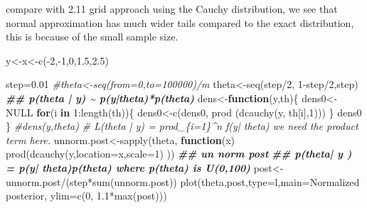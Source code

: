 \documentclass[
]{book}
\newenvironment{Shaded}{\begin{snugshade}}{\end{snugshade}}
\newcommand{\AttributeTok}[1]{\textcolor[rgb]{0.77,0.63,0.00}{#1}}
\newcommand{\CommentTok}[1]{\textcolor[rgb]{0.56,0.35,0.01}{\textit{#1}}}
\newcommand{\ConstantTok}[1]{\textcolor[rgb]{0.00,0.00,0.00}{#1}}
\newcommand{\ControlFlowTok}[1]{\textcolor[rgb]{0.13,0.29,0.53}{\textbf{#1}}}
\newcommand{\DecValTok}[1]{\textcolor[rgb]{0.00,0.00,0.81}{#1}}
\newcommand{\DocumentationTok}[1]{\textcolor[rgb]{0.56,0.35,0.01}{\textbf{\textit{#1}}}}
\newcommand{\FloatTok}[1]{\textcolor[rgb]{0.00,0.00,0.81}{#1}}
\newcommand{\FunctionTok}[1]{\textcolor[rgb]{0.00,0.00,0.00}{#1}}
\newcommand{\NormalTok}[1]{#1}
\newcommand{\OtherTok}[1]{\textcolor[rgb]{0.56,0.35,0.01}{#1}}
\newcommand{\SpecialCharTok}[1]{\textcolor[rgb]{0.00,0.00,0.00}{#1}}
\newcommand{\StringTok}[1]{\textcolor[rgb]{0.31,0.60,0.02}{#1}}
\theoremstyle{definition}
\theoremstyle{definition}
\theoremstyle{definition}
\theoremstyle{definition}
\theoremstyle{remark}
\begin{document}
compare with 2.11 grid approach using the Cauchy distribution, we see that normal approximation has much wider tails compared to the exact distribution, this is because of the small sample size.

\begin{Shaded}
\begin{Highlighting}[]
\NormalTok{  y}\OtherTok{\textless{}{-}}\NormalTok{x}\OtherTok{\textless{}{-}}\FunctionTok{c}\NormalTok{(}\SpecialCharTok{{-}}\DecValTok{2}\NormalTok{,}\SpecialCharTok{{-}}\DecValTok{1}\NormalTok{,}\DecValTok{0}\NormalTok{,}\FloatTok{1.5}\NormalTok{,}\FloatTok{2.5}\NormalTok{)}

\NormalTok{  step}\OtherTok{=}\FloatTok{0.01}
\CommentTok{\#theta\textless{}{-}seq(from=0,to=100000)/m}
\NormalTok{ theta}\OtherTok{\textless{}{-}}\FunctionTok{seq}\NormalTok{(step}\SpecialCharTok{/}\DecValTok{2}\NormalTok{, }\DecValTok{1}\SpecialCharTok{{-}}\NormalTok{step}\SpecialCharTok{/}\DecValTok{2}\NormalTok{,step)}
 \DocumentationTok{\#\# p(theta | y) \textasciitilde{} p(y|theta)*p(theta)}
\NormalTok{ dens}\OtherTok{\textless{}{-}}\ControlFlowTok{function}\NormalTok{(y,th)\{}
\NormalTok{   dens0}\OtherTok{\textless{}{-}}\ConstantTok{NULL}
   \ControlFlowTok{for}\NormalTok{(i }\ControlFlowTok{in} \DecValTok{1}\SpecialCharTok{:}\FunctionTok{length}\NormalTok{(th))\{}
\NormalTok{     dens0}\OtherTok{\textless{}{-}}\FunctionTok{c}\NormalTok{(dens0, }\FunctionTok{prod}\NormalTok{ (}\FunctionTok{dcauchy}\NormalTok{(y, th[i],}\DecValTok{1}\NormalTok{)))}
\NormalTok{   \}}
\NormalTok{   dens0}
\NormalTok{ \}}
 \CommentTok{\#dens(y,theta)}
  \CommentTok{\# L(theta | y) = prod\_\{i=1\}\^{}n  f(y| theta)  we need the product term here.}
\NormalTok{ unnorm.post}\OtherTok{\textless{}{-}}\FunctionTok{sapply}\NormalTok{(theta, }\ControlFlowTok{function}\NormalTok{(x)  }\FunctionTok{prod}\NormalTok{(}\FunctionTok{dcauchy}\NormalTok{(y,}\AttributeTok{location=}\NormalTok{x,}\AttributeTok{scale=}\DecValTok{1}\NormalTok{) )) }\DocumentationTok{\#\# un norm post}
   \DocumentationTok{\#\# p(theta| y ) = p(y| theta)p(theta)  where p(theta) is U(0,100)}
\NormalTok{ post}\OtherTok{\textless{}{-}}\NormalTok{unnorm.post}\SpecialCharTok{/}\NormalTok{(step}\SpecialCharTok{*}\FunctionTok{sum}\NormalTok{(unnorm.post))}
 \FunctionTok{plot}\NormalTok{(theta,post,}\AttributeTok{type=}\StringTok{\textquotesingle{}l\textquotesingle{}}\NormalTok{,}\AttributeTok{main=}\StringTok{\textquotesingle{}Normalized posterior\textquotesingle{}}\NormalTok{, }\AttributeTok{ylim=}\FunctionTok{c}\NormalTok{(}\DecValTok{0}\NormalTok{, }\FloatTok{1.1}\SpecialCharTok{*}\FunctionTok{max}\NormalTok{(post)))}
\end{Highlighting}
\end{Shaded}
\end{document}

